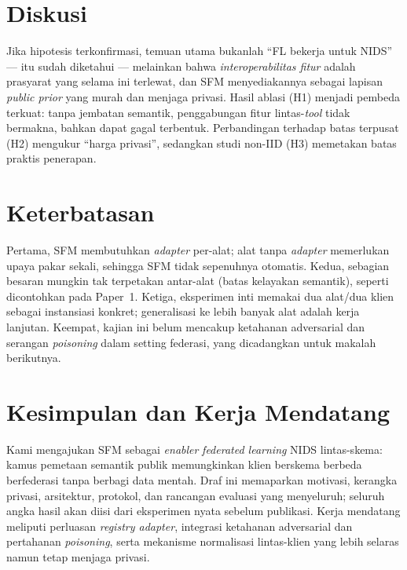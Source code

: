 \documentclass[11pt,a4paper]{article}
\begin{document}
\section{Diskusi}
\label{sec:discussion}

Jika hipotesis terkonfirmasi, temuan utama bukanlah ``FL bekerja untuk NIDS'' ---
itu sudah diketahui --- melainkan bahwa \emph{interoperabilitas fitur} adalah
prasyarat yang selama ini terlewat, dan SFM menyediakannya sebagai lapisan
\emph{public prior} yang murah dan menjaga privasi. Hasil ablasi (H1) menjadi
pembeda terkuat: tanpa jembatan semantik, penggabungan fitur lintas-\emph{tool}
tidak bermakna, bahkan dapat gagal terbentuk. Perbandingan terhadap batas terpusat
(H2) mengukur ``harga privasi'', sedangkan studi non-IID (H3) memetakan batas
praktis penerapan.

\FloatBarrier
\section{Keterbatasan}
\label{sec:limitations}

Pertama, SFM membutuhkan \emph{adapter} per-alat; alat tanpa \emph{adapter}
memerlukan upaya pakar sekali, sehingga SFM tidak sepenuhnya otomatis. Kedua,
sebagian besaran mungkin tak terpetakan antar-alat (batas kelayakan semantik),
seperti dicontohkan pada Paper~1. Ketiga, eksperimen inti memakai dua
alat/dua klien sebagai instansiasi konkret; generalisasi ke lebih banyak alat
adalah kerja lanjutan. Keempat, kajian ini belum mencakup ketahanan adversarial
dan serangan \emph{poisoning} dalam setting federasi, yang dicadangkan untuk
makalah berikutnya.

\FloatBarrier
\section{Kesimpulan dan Kerja Mendatang}
\label{sec:conclusion}

Kami mengajukan SFM sebagai \emph{enabler} \emph{federated learning} NIDS
lintas-skema: kamus pemetaan semantik publik memungkinkan klien berskema berbeda
berfederasi tanpa berbagi data mentah. Draf ini memaparkan motivasi, kerangka
privasi, arsitektur, protokol, dan rancangan evaluasi yang menyeluruh; seluruh
angka hasil akan diisi dari eksperimen nyata sebelum publikasi. Kerja mendatang
meliputi perluasan \emph{registry adapter}, integrasi ketahanan adversarial dan
pertahanan \emph{poisoning}, serta mekanisme normalisasi lintas-klien yang lebih
selaras namun tetap menjaga privasi.
\end{document}
